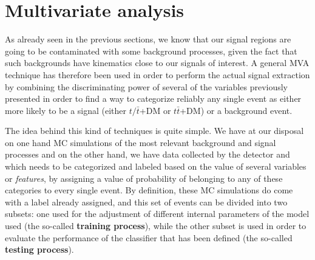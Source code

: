 \documentclass[a4paper, 10pt, openright]{report}
\begin{document}
\begin{itemize}
%
\end{itemize}

\section{Multivariate analysis} \label{section:NN}

As already seen in the previous sections, we know that our signal regions are going to be contaminated with some background processes, given the fact that such backgrounds have kinematics close to our signals of interest. A general \acf{MVA} technique has therefore been used in order to perform the actual signal extraction by combining the discriminating power of several of the variables previously presented in order to find a way to categorize reliably any single event as either more likely to be a signal (either $t/\bar t$+DM or $t \bar t$+DM) or a background event.

The idea behind this kind of techniques is quite simple. We have at our disposal on one hand \ac{MC} simulations of the most relevant background and signal processes and on the other hand, we have data collected by the detector and which needs to be categorized and labeled based on the value of several variables or \textit{features}, by assigning a value of probability of belonging to any of these categories to every single event. By definition, these \ac{MC} simulations do come with a label already assigned, and this set of events can be divided into two subsets: one used for the adjustment of different internal parameters of the model used (the so-called \textbf{training process}), while the other subset is used in order to evaluate the performance of the classifier that has been defined (the so-called \textbf{testing process}).
\end{document}
